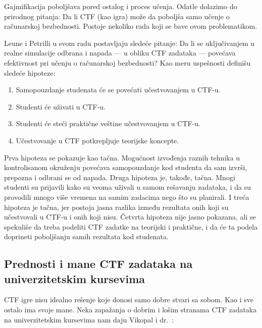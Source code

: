 \documentclass[12pt, a4paper, twocolumn]{article}
\begin{document}
Gajmifikacija poboljšava pored ostalog i proces učenja. \cite{gami1, gami2}
Odatle dolazimo do prirodnog pitanja: Da li CTF (kao igra) može da poboljša
samo učenje o računarskoj bezbednosti. Postoje nekoliko rada koji se bave
ovom problematikom.

Leune i Petrilli \cite{ctf_leune} u svom radu postavljaju sledeće pitanje:
Da li se uključivanjem u realne simulacije odbrana i napada --- u obliku
CTF zadataka --- povećava efektivnost pri učenju o računarskoj bezbednosti?
Kao meru uspešnosti definišu sledeće hipoteze:

\begin{enumerate}
    \item Samopouzdanje studenata će se povećati učestvovanjem u CTF-u.
    \item Studenti će uživati u CTF-u.
    \item Studenti će steći praktične veštine učestvovanjem u CTF-u.
    \item Učestvovanje u CTF potkrepljuje teorijske koncepte.
\end{enumerate}

Prva hipoteza se pokazuje kao tačna. Mogućnost izvođenja raznih tehnika u 
kontrolisanom okruženju povećava samopouzdanje kod studenta da sam izvrši,
prepozna i odbrani se od napada. Druga hipoteza je, takođe, tačna. Mnogi
studenti su prijavili kako su veoma uživali u samom rešavanju zadataka, i
da su provodili mnogo više vremena na samim zadacima nego što su planirali.
I treća hipoteza je tačna, jer postoja jasna razlika između rezultata
onih koji su učestvovali u CTF-u i onih koji nisu. Četvrta hipoteza nije jasno
pokazana, ali se spekuliše da treba podeliti CTF zadatke na teorijski i
praktične, i da će ta podela doprineti poboljšanju samih rezultata kod
studenata.

\subsection{Prednosti i mane CTF zadataka na univerzitetskim kursevima}

CTF igre nisu idealno rešenje koje donosi samo dobre stvari sa sobom.
Kao i sve ostalo ima svoje mane. Neka zapažanja o dobrim i lošim stranama 
CTF zadataka na univerzitetskim kursevima nam daju Vikopal i dr.\ 
\cite{ctf_uni}:
\end{document}
